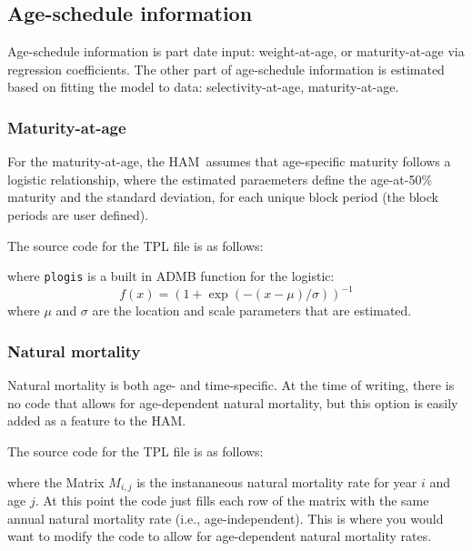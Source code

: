 \documentclass[12pt,letterpaper]{article}
\newcommand{\ham}{HAM}
\begin{document}

  \subsection{Age-schedule information} %
  \label{sub:age_schedule_information}
    Age-schedule information is part date input: weight-at-age, or maturity-at-age via regression coefficients. The other part of age-schedule information is estimated based on fitting the model to data: selectivity-at-age, maturity-at-age.  

    \subsubsection{Maturity-at-age} %
    \label{ssub:maturity_at_age}
      For the maturity-at-age, the \ham\ assumes that age-specific maturity follows a logistic relationship, where the estimated paraemeters define the age-at-50\% maturity and the standard deviation, for each unique block period (the block periods are user defined). 

       The source code for the TPL file is as follows:
      
      where \texttt{plogis} is a built in ADMB function for the logistic: \[f(x) =  (1+\exp(-(x-\mu)/\sigma))^{-1} \] where $\mu$ and $\sigma$ are the location and scale parameters that are estimated.
    

    \subsubsection{Natural mortality} %
    \label{ssub:natural_mortality}
    
      Natural mortality is both age- and time-specific.  At the time of writing, there is no code that allows for age-dependent natural mortality, but this option is easily added as a feature to the \ham.

      The source code for the TPL file is as follows:
      
      where the Matrix $M_{i,j}$ is the instananeous natural mortality rate for year $i$ and age $j$.  At this point the code just fills each row of the matrix with the same annual natural mortality rate (i.e., age-independent).  This is where you would want to modify the code to allow for age-dependent natural mortality rates.
\end{document}
